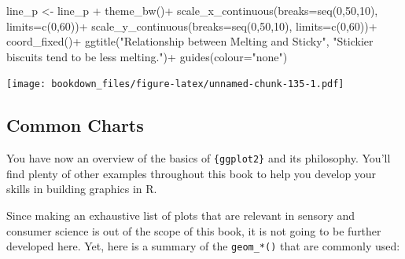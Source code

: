\documentclass[
]{krantz}
\makeatletter
\newenvironment{Shaded}{\begin{snugshade}}{\end{snugshade}}
\newcommand{\AttributeTok}[1]{\textcolor[rgb]{0.61,0.61,0.61}{#1}}
\newcommand{\DecValTok}[1]{\textcolor[rgb]{0.06,0.06,0.06}{#1}}
\newcommand{\FunctionTok}[1]{\textcolor[rgb]{0,0,0}{#1}}
\newcommand{\NormalTok}[1]{#1}
\newcommand{\OtherTok}[1]{\textcolor[rgb]{0.37,0.37,0.37}{#1}}
\newcommand{\SpecialCharTok}[1]{\textcolor[rgb]{0,0,0}{#1}}
\newcommand{\StringTok}[1]{\textcolor[rgb]{0.5,0.5,0.5}{#1}}
\newenvironment{kframe}{%
\medskip{}
\setlength{\fboxsep}{.8em}
 \def\at@end@of@kframe{}%
 \ifinner\ifhmode%
  \def\at@end@of@kframe{\end{minipage}}%
  \begin{minipage}{\columnwidth}%
 \fi\fi%
 \def\FrameCommand##1{\hskip\@totalleftmargin \hskip-\fboxsep
 \colorbox{shadecolor}{##1}\hskip-\fboxsep
     \hskip-\linewidth \hskip-\@totalleftmargin \hskip\columnwidth}%
 \MakeFramed {\advance\hsize-\width
   \@totalleftmargin\z@ \linewidth\hsize
   \@setminipage}}%
 {\par\unskip\endMakeFramed%
 \at@end@of@kframe}
\renewenvironment{Shaded}{\begin{kframe}}{\end{kframe}}
\makeatother
\begin{document}
\begin{Shaded}
\begin{Highlighting}[]
\NormalTok{line\_p }\OtherTok{\textless{}{-}}\NormalTok{ line\_p }\SpecialCharTok{+}
  \FunctionTok{theme\_bw}\NormalTok{()}\SpecialCharTok{+}
  \FunctionTok{scale\_x\_continuous}\NormalTok{(}\AttributeTok{breaks=}\FunctionTok{seq}\NormalTok{(}\DecValTok{0}\NormalTok{,}\DecValTok{50}\NormalTok{,}\DecValTok{10}\NormalTok{), }\AttributeTok{limits=}\FunctionTok{c}\NormalTok{(}\DecValTok{0}\NormalTok{,}\DecValTok{60}\NormalTok{))}\SpecialCharTok{+}
  \FunctionTok{scale\_y\_continuous}\NormalTok{(}\AttributeTok{breaks=}\FunctionTok{seq}\NormalTok{(}\DecValTok{0}\NormalTok{,}\DecValTok{50}\NormalTok{,}\DecValTok{10}\NormalTok{), }\AttributeTok{limits=}\FunctionTok{c}\NormalTok{(}\DecValTok{0}\NormalTok{,}\DecValTok{60}\NormalTok{))}\SpecialCharTok{+}
  \FunctionTok{coord\_fixed}\NormalTok{()}\SpecialCharTok{+}
  \FunctionTok{ggtitle}\NormalTok{(}\StringTok{"Relationship between Melting and Sticky"}\NormalTok{,}
          \StringTok{"Stickier biscuits tend to be less melting."}\NormalTok{)}\SpecialCharTok{+}
  \FunctionTok{guides}\NormalTok{(}\AttributeTok{colour=}\StringTok{"none"}\NormalTok{)}
\end{Highlighting}
\end{Shaded}

\texttt{[image: bookdown\_files/figure-latex/unnamed-chunk-135-1.pdf]}

\hypertarget{common-charts}{%
\subsection{Common Charts}\label{common-charts}}

You have now an overview of the basics of \texttt{\{ggplot2\}} and its philosophy. You'll find plenty of other examples throughout this book to help you develop your skills in building graphics in R.

Since making an exhaustive list of plots that are relevant in sensory and consumer science is out of the scope of this book, it is not going to be further developed here. Yet, here is a summary of the \texttt{geom\_*()} that are commonly used:
\end{document}
